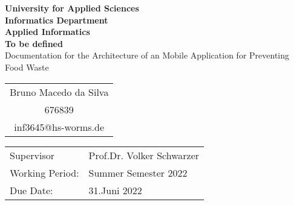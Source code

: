 \begin{titlepage}
    \vspace*{2mm}
    \begin{center}
        \Large
        \textbf{University for Applied Sciences}\\
        \textbf{Informatics Department}\\
        \textbf{Applied Informatics}\\
        \vspace{1cm}
        \textbf{To be defined}\\
        \vspace{1cm}
        \large
        Documentation for the Architecture of an Mobile Application for Preventing Food Waste\\
        \vspace{4cm}
        \begin {table}[ht]
            \centering
            \begin{tabular}{c}
                Bruno Macedo da Silva    \\ 
                676839                   \\
                inf3645@hs-worms.de      \\
            \end{tabular}
        \end {table}
        \vspace{2cm}
        \large
        \vspace{1cm}
         \begin {table}[ht]
             \centering
             \begin{tabular}{l l}
                Supervisor         & Prof.Dr. Volker Schwarzer \\
                Working Period:    & Summer Semester 2022 \\
                Due Date:          & 31.Juni 2022 \\
             \end{tabular}
         \end {table}
    \end{center}
    \normalsize
    \vfill
 


\end{titlepage}